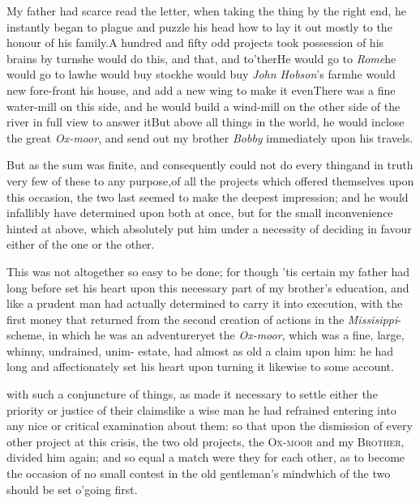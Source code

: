 \documentclass{article}
\begin{document}
My father had scarce read the letter, when taking the thing by
the right end, he instantly began to plague and puzzle his head how
to lay it out mostly to the honour of his family.\tsk A
hundred and fifty odd projects took possession of his brains by
turns\tsk he would do this, and that, and to’ther\tsk He
would go to \textit{Rome}\tsh he would go to
law\tsh he would buy stock\tsh he would buy
\textit{John Hobson}’s farm\tsk he would new fore-front his
house, and add a new wing to make it even\tsk There was a
fine water-mill on this side, and he would build a wind-mill on the
other side of the river in full view to answer it\tsk But above
all things in the world, he would inclose the great \textit{Ox-moor}, 
and send out my brother \textit{Bobby} immediately upon his
travels.

But as the sum was finite, and consequently could not do
every thing\tsk and in truth very few of these to any
purpose,\tsk of all the projects which offered themselves
upon this occasion, the two last seemed to make the deepest
impression; and he would infallibly have determined upon
both at once, but for the small inconvenience hinted at
above, which absolutely put him under a necessity of
deciding in favour either of the one or the other.

This was not altogether so easy to be done; for though
’tis certain my father had long before set his heart upon
this necessary part of my brother’s education, and like a
prudent man had actually determined to carry it into execution,
with the first money that returned from the second creation of
actions in the \textit{Missisippi}-scheme, in which he was an
adventurer\tsh yet the \textit{Ox-moor}, which was a fine,
large, whinny, undrained, unim-\break
{}\break
estate, had almost as old a claim upon him: he had
long and affectionately set his heart upon turning it likewise to
some account.

 with such a conjuncture
of things, as made it necessary to settle either the priority or justice of their claims\tsh like a
wise man he had refrained entering into any nice or critical
examination about them: so that upon the dismission of every other
project at this crisis,\tsh{} the two old projects, the
O\textsc{x-moor} and my \textsc{Brother}, divided him
again; and so equal a match were they for each other, as to become
the occasion of no small contest in the old gentleman’s
mind\tsk which of the two should be set o’going first.
\end{document}
